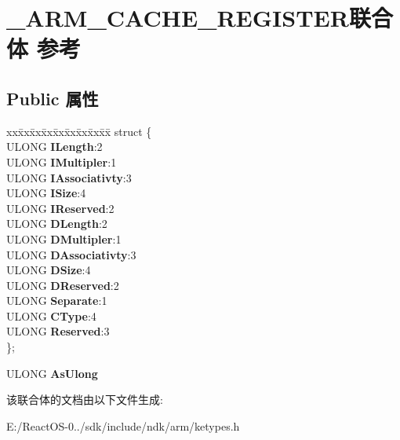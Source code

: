 \hypertarget{union___a_r_m___c_a_c_h_e___r_e_g_i_s_t_e_r}{}\section{\+\_\+\+A\+R\+M\+\_\+\+C\+A\+C\+H\+E\+\_\+\+R\+E\+G\+I\+S\+T\+E\+R联合体 参考}
\label{union___a_r_m___c_a_c_h_e___r_e_g_i_s_t_e_r}
\subsection*{Public 属性}
\begin{DoxyCompactItemize}
\item 
\mbox{\label{union___a_r_m___c_a_c_h_e___r_e_g_i_s_t_e_r_a26f6fc2faf4705f7bdf7b9d4f06dee83}} 
\begin{tabbing}
xx\=xx\=xx\=xx\=xx\=xx\=xx\=xx\=xx\=\kill
struct \{\\
\>ULONG {\bfseries ILength}:2\\
\>ULONG {\bfseries IMultipler}:1\\
\>ULONG {\bfseries IAssociativty}:3\\
\>ULONG {\bfseries ISize}:4\\
\>ULONG {\bfseries IReserved}:2\\
\>ULONG {\bfseries DLength}:2\\
\>ULONG {\bfseries DMultipler}:1\\
\>ULONG {\bfseries DAssociativty}:3\\
\>ULONG {\bfseries DSize}:4\\
\>ULONG {\bfseries DReserved}:2\\
\>ULONG {\bfseries Separate}:1\\
\>ULONG {\bfseries CType}:4\\
\>ULONG {\bfseries Reserved}:3\\
\}; \\

\end{tabbing}\item 
\mbox{\label{union___a_r_m___c_a_c_h_e___r_e_g_i_s_t_e_r_abac7b5c2cb83f00bebee6a2e342f8c8f}} 
U\+L\+O\+NG {\bfseries As\+Ulong}
\end{DoxyCompactItemize}


该联合体的文档由以下文件生成\+:\begin{DoxyCompactItemize}
\item 
E\+:/\+React\+O\+S-\/0../sdk/include/ndk/arm/ketypes.\+h\end{DoxyCompactItemize}
